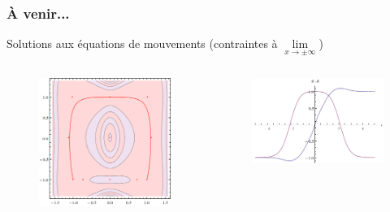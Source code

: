 \documentclass[handout]{beamer}
\begin{document}
\begin{frame}\frametitle{À venir...}
Solutions aux équations de mouvements (contraintes à $\lim\limits_{x \to \pm\infty}$)

\begin{columns}[T]
    \begin{column}[T]{.5\linewidth}
    \begin{figure}
    \includegraphics[scale=0.35]{traj.png}
    \end{figure}
    \end{column}

    \begin{column}[T]{.5\linewidth}
    \begin{figure}
    \includegraphics[scale=0.45]{phi_psi.png}
    \end{figure}
    \end{column}
\end{columns}
    
\end{frame}
\end{document}
